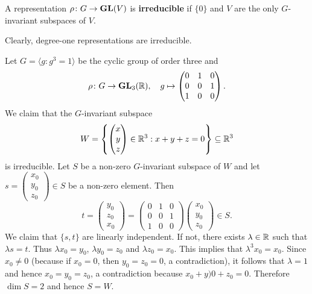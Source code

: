 \begin{definition}
    A representation $\rho\colon G\to\mathbf{GL}(V)$ is \textbf{irreducible} if
    $\{0\}$ and $V$ are the only $G$-invariant subspaces of $V$.
\end{definition}

Clearly, degree-one representations are irreducible.

\begin{example}
        Let $G=\langle g:g^3=1\rangle$ be the
    cyclic group of order three
    and
    \[
    \rho\colon G\to\mathbf{GL}_3(\mathbb{R}),
    \quad
    g\mapsto\begin{pmatrix}
        0&1&0\\
        0&0&1\\
        1&0&0
    \end{pmatrix}.
    \]
    We claim that the $G$-invariant subspace
    \[
    W=\left\{
    \begin{pmatrix}
    x\\
    y\\
    z
    \end{pmatrix}\in\mathbb{R}^3:x+y+z=0\right\}\subseteq\mathbb{R}^3
    \]
    is irreducible. Let $S$ be a non-zero $G$-invariant subspace of $W$ and let $s=\begin{pmatrix}x_0\\y_0\\z_0\end{pmatrix}\in S$ be a non-zero element. Then
    \[
    t=\begin{pmatrix}y_0\\z_0\\x_0\end{pmatrix}
    =\begin{pmatrix}
        0&1&0\\
        0&0&1\\
        1&0&0
    \end{pmatrix}
    \begin{pmatrix}x_0\\y_0\\z_0\end{pmatrix}\in S.
    \]
    We claim that $\{s,t\}$ are linearly independent. If not, there exists $\lambda\in\mathbb{R}$ such that
    $\lambda s=t$. Thus $\lambda x_0=y_0$, $\lambda y_0=z_0$ and $\lambda z_0=x_0$. This implies that
    $\lambda^3x_0=x_0$. Since $x_0\ne 0$ (because if $x_0=0$, then $y_0=z_0=0$, a contradiction), it follows that
    $\lambda=1$ and hence $x_0=y_0=z_0$, a contradiction because $x_0+y)0+z_0=0$.
    Therefore $\dim S=2$ and hence $S=W$.
\end{example}

